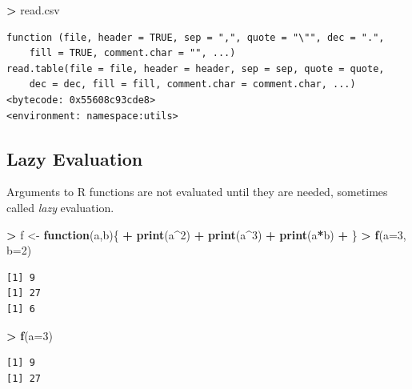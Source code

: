 \documentclass[]{krantz}
\makeatletter
\newenvironment{Shaded}{\begin{snugshade}}{\end{snugshade}}
\newcommand{\KeywordTok}[1]{\textcolor[rgb]{0.27,0.27,0.27}{\textbf{#1}}}
\newcommand{\DataTypeTok}[1]{\textcolor[rgb]{0.27,0.27,0.27}{#1}}
\newcommand{\DecValTok}[1]{\textcolor[rgb]{0.06,0.06,0.06}{#1}}
\newcommand{\StringTok}[1]{\textcolor[rgb]{0.5,0.5,0.5}{#1}}
\newcommand{\ControlFlowTok}[1]{\textcolor[rgb]{0.27,0.27,0.27}{\textbf{#1}}}
\newcommand{\OperatorTok}[1]{\textcolor[rgb]{0.43,0.43,0.43}{\textbf{#1}}}
\newcommand{\NormalTok}[1]{#1}
\newenvironment{kframe}{%
\medskip{}
\setlength{\fboxsep}{.8em}
 \def\at@end@of@kframe{}%
 \ifinner\ifhmode%
  \def\at@end@of@kframe{\end{minipage}}%
  \begin{minipage}{\columnwidth}%
 \fi\fi%
 \def\FrameCommand##1{\hskip\@totalleftmargin \hskip-\fboxsep
 \colorbox{shadecolor}{##1}\hskip-\fboxsep
     \hskip-\linewidth \hskip-\@totalleftmargin \hskip\columnwidth}%
 \MakeFramed {\advance\hsize-\width
   \@totalleftmargin\z@ \linewidth\hsize
   \@setminipage}}%
 {\par\unskip\endMakeFramed%
 \at@end@of@kframe}
\renewenvironment{Shaded}{\begin{kframe}}{\end{kframe}}
\makeatother
\begin{document}
\begin{Shaded}
\begin{Highlighting}[]
\OperatorTok{>}\StringTok{ }\NormalTok{read.csv}
\end{Highlighting}
\end{Shaded}

\begin{verbatim}
function (file, header = TRUE, sep = ",", quote = "\"", dec = ".", 
    fill = TRUE, comment.char = "", ...) 
read.table(file = file, header = header, sep = sep, quote = quote, 
    dec = dec, fill = fill, comment.char = comment.char, ...)
<bytecode: 0x55608c93cde8>
<environment: namespace:utils>
\end{verbatim}

\subsection{Lazy Evaluation}\label{lazy-evaluation}

Arguments to R functions are not evaluated until they are needed,
sometimes called \emph{lazy} evaluation.

\begin{Shaded}
\begin{Highlighting}[]
\OperatorTok{>}\StringTok{ }\NormalTok{f <-}\StringTok{ }\ControlFlowTok{function}\NormalTok{(a,b)\{}
\OperatorTok{+}\StringTok{     }\KeywordTok{print}\NormalTok{(a}\OperatorTok{^}\DecValTok{2}\NormalTok{)}
\OperatorTok{+}\StringTok{     }\KeywordTok{print}\NormalTok{(a}\OperatorTok{^}\DecValTok{3}\NormalTok{)}
\OperatorTok{+}\StringTok{     }\KeywordTok{print}\NormalTok{(a}\OperatorTok{*}\NormalTok{b)}
\OperatorTok{+}\StringTok{ }\NormalTok{\}}
\OperatorTok{>}\StringTok{ }\KeywordTok{f}\NormalTok{(}\DataTypeTok{a=}\DecValTok{3}\NormalTok{, }\DataTypeTok{b=}\DecValTok{2}\NormalTok{)}
\end{Highlighting}
\end{Shaded}

\begin{verbatim}
[1] 9
[1] 27
[1] 6
\end{verbatim}

\begin{Shaded}
\begin{Highlighting}[]
\OperatorTok{>}\StringTok{ }\KeywordTok{f}\NormalTok{(}\DataTypeTok{a=}\DecValTok{3}\NormalTok{)}
\end{Highlighting}
\end{Shaded}

\begin{verbatim}
[1] 9
[1] 27
\end{verbatim}
\end{document}
